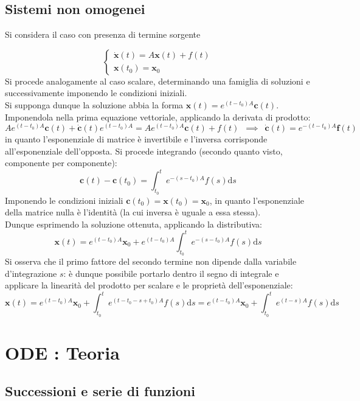 \documentclass[10pt, oneside]{book}
\theoremstyle{plain}
\begin{document}
\section{Sistemi non omogenei}
Si considera il caso con presenza di termine sorgente

\[\begin{cases}
\dot{\mathbf{x}}(t) = A \mathbf{x}(t) + f(t)\\
\mathbf{x}(t_0) = \mathbf{x}_0
\end{cases}\]
Si procede analogamente al caso scalare, determinando una famiglia di soluzioni e successivamente imponendo le condizioni iniziali.
\\Si supponga dunque la soluzione abbia la forma $\displaystyle \mathbf{x}(t) = e^{(t - t_0) A} \mathbf{c}(t)$. Imponendola nella prima equazione vettoriale, applicando la derivata di prodotto:
\[A e^{(t - t_0) A} \mathbf{c}(t) + \dot{\mathbf{c}}(t) e^{(t - t_0) A} = A e^{(t - t_0) A} \mathbf{c}(t) + f(t) \enspace \implies \enspace \dot{\mathbf{c}}(t) = e^{- (t - t_0) A} \mathbf{f}(t)\]
in quanto l'esponenziale di matrice è invertibile e l'inversa corrisponde all'esponenziale dell'opposta. Si procede integrando (secondo quanto visto, componente per componente):
\[\mathbf{c}(t) - \mathbf{c}(t_0) = \int_{t_0}^{t} e^{- (s - t_0) A} f(s)\textrm{d}s\]
Imponendo le condizioni iniziali $\mathbf{c}(t_0) = \mathbf{x}(t_0) = \mathbf{x}_0$, in quanto l'esponenziale della matrice nulla è l'identità (la cui inversa è uguale a essa stessa).
\\Dunque esprimendo la soluzione ottenuta, applicando la distributiva:
\[\mathbf{x}(t) = e^{(t - t_0) A}\mathbf{x}_0 + e^{(t - t_0) A} \int_{t_0}^{t} e^{- (s - t_0) A} f(s)\textrm{d}s\]
Si osserva che il primo fattore del secondo termine non dipende dalla variabile d'integrazione $s$: è dunque possibile portarlo dentro il segno di integrale e applicare la linearità del prodotto per scalare e le proprietà dell'esponenziale:
\[\mathbf{x}(t) = e^{(t - t_0) A}\mathbf{x}_0 + \int_{t_0}^{t} e^{(t - t_0 - s + t_0) A} f(s)\textrm{d}s = e^{(t - t_0) A}\mathbf{x}_0 + \int_{t_0}^{t} e^{(t - s) A} f(s)\textrm{d}s\]


\chapter{ODE : Teoria}
\section{Successioni e serie di funzioni}
\end{document}

